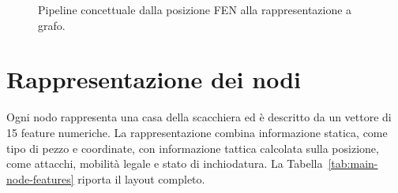 \begin{figure}[htbp]
    \centering
    \caption{Pipeline concettuale dalla posizione FEN alla rappresentazione a grafo.}
    \label{fig:fen-to-graph}
\end{figure}

\section{Rappresentazione dei nodi}

Ogni nodo rappresenta una casa della scacchiera ed \`e descritto da un vettore di 15 feature numeriche. La rappresentazione combina informazione statica, come tipo di pezzo e coordinate, con informazione tattica calcolata sulla posizione, come attacchi, mobilit\`a legale e stato di inchiodatura. La Tabella~\ref{tab:main-node-features} riporta il layout completo.

